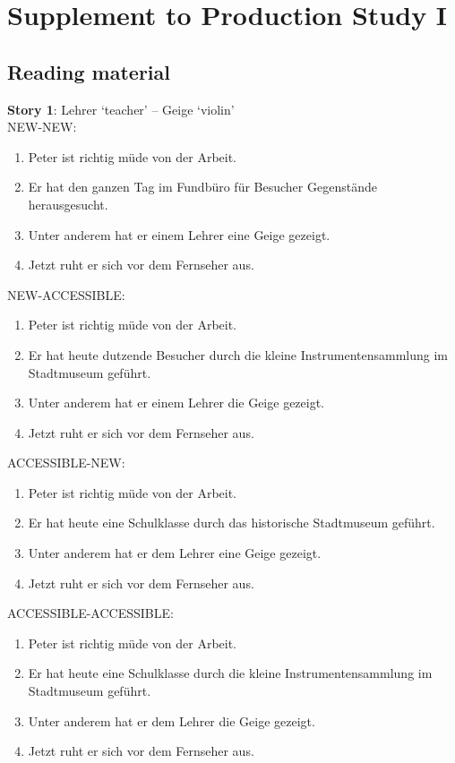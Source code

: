\appendix

\chapter{Supplement to Production Study I} 
\label{Appendix A}

\section{Reading material}

\textbf{Story 1}: Lehrer `teacher' – Geige `violin'\\

NEW-NEW:

\begin{enumerate}
\item Peter ist richtig müde von der Arbeit.
\item Er hat den ganzen Tag im Fundbüro für Besucher Gegenstände herausgesucht.
\item Unter anderem hat er einem Lehrer eine Geige gezeigt.
\item Jetzt ruht er sich vor dem Fernseher aus.
\end{enumerate}

NEW-ACCESSIBLE:

\begin{enumerate}
\item Peter ist richtig müde von der Arbeit.
\item Er hat heute dutzende Besucher durch die kleine Instrumentensammlung im Stadtmuseum geführt.
\item Unter anderem hat er einem Lehrer die Geige gezeigt.
\item Jetzt ruht er sich vor dem Fernseher aus.
\end{enumerate}

ACCESSIBLE-NEW:

\begin{enumerate}
\item Peter ist richtig müde von der Arbeit.
\item Er hat heute eine Schulklasse durch das historische Stadtmuseum geführt.
\item Unter anderem hat er dem Lehrer eine Geige gezeigt.
\item Jetzt ruht er sich vor dem Fernseher aus.
\end{enumerate}

ACCESSIBLE-ACCESSIBLE:

\begin{enumerate}
\item Peter ist richtig müde von der Arbeit.
\item Er hat heute eine Schulklasse durch die kleine Instrumentensammlung im Stadtmuseum geführt.
\item Unter anderem hat er dem Lehrer die Geige gezeigt.
\item Jetzt ruht er sich vor dem Fernseher aus.
\end{enumerate}

